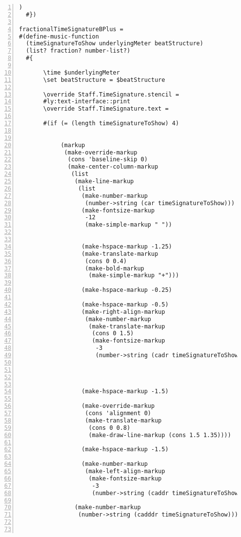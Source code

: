 \begin{Verbatim}[numbers=left,xleftmargin=5mm]
            )
  #})

fractionalTimeSignatureBPlus =
#(define-music-function
  (timeSignatureToShow underlyingMeter beatStructure)
  (list? fraction? number-list?)
  #{

       \time $underlyingMeter
       \set beatStructure = $beatStructure

       \override Staff.TimeSignature.stencil =
       #ly:text-interface::print
       \override Staff.TimeSignature.text =

       #(if (= (length timeSignatureToShow) 4)


            (markup
             (make-override-markup
              (cons 'baseline-skip 0)
              (make-center-column-markup
               (list
                (make-line-markup
                 (list
                  (make-number-markup
                   (number->string (car timeSignatureToShow)))
                  (make-fontsize-markup
                   -12
                   (make-simple-markup " "))


                  (make-hspace-markup -1.25)
                  (make-translate-markup
                   (cons 0 0.4)
                   (make-bold-markup
                    (make-simple-markup "+")))

                  (make-hspace-markup -0.25)

                  (make-hspace-markup -0.5)
                  (make-right-align-markup
                   (make-number-markup
                    (make-translate-markup
                     (cons 0 1.5)
                     (make-fontsize-markup
                      -3
                      (number->string (cadr timeSignatureToShow))))))




                  (make-hspace-markup -1.5)

                  (make-override-markup
                   (cons 'alignment 0)
                   (make-translate-markup
                    (cons 0 0.8)
                    (make-draw-line-markup (cons 1.5 1.35))))

                  (make-hspace-markup -1.5)

                  (make-number-markup
                   (make-left-align-markup
                    (make-fontsize-markup
                     -3
                     (number->string (caddr timeSignatureToShow)))))))

                (make-number-markup
                 (number->string (cadddr timeSignatureToShow)))))))



\end{Verbatim}
